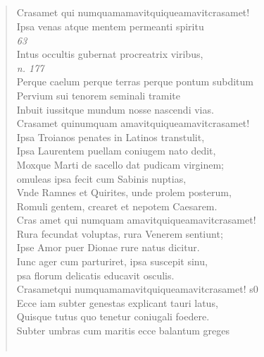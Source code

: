 \documentclass[11pt, a4paper]{report}
\begin{document}
            \subsection*{}
      \begin{verse}
      Crasamet qui numquamamavitquiqueamavitcrasamet! \\ Ipsa venas atque mentem permeanti spiritu \\ \textit{63} \\ Intus occultis gubernat procreatrix viribus, \\ \textit{n. 177} \\ Perque caelum perque terras perque pontum subditum \\ Pervium sui tenorem seminali tramite \\ Inbuit iussitque mundum nosse nascendi vias. \\ Crasamet quinumquam amavitquiqueamavitcrasamet! \\ Ipsa Troianos penates in Latinos transtulit, \\ Ipsa Laurentem puellam coniugem nato dedit, \\ Moxque Marti de sacello dat pudicam virginem; \\ omuleas ipsa fecit cum Sabinis nuptias, \\ Vnde Ramnes et Quirites, unde prolem posterum, \\ Romuli gentem, crearet et nepotem Caesarem. \\ Cras amet qui numquam amavitquiqueamavitcrasamet! \\ Rura fecundat voluptas, rura Venerem sentiunt; \\ Ipse Amor puer Dionae rure natus dicitur. \\ Iunc ager cum parturiret, ipsa suscepit sinu, \\ psa florum delicatis educavit osculis. \\ Crasametqui numquamamavitquiqueamavitcrasamet! s0 \\ Ecce iam subter genestas explicant tauri latus, \\ Quisque tutus quo tenetur coniugali foedere. \\ Subter umbras cum maritis ecce balantum greges \\ 
        ﻿\pagebreak 

\end{verse}
\end{document}
